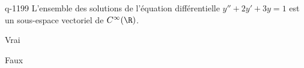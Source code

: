 \begin{truefalse}{q-1199}
L'ensemble des solutions de l'équation différentielle $y'' + 2y' + 3y = 1$ est un sous-espace vectoriel de $C^\infty(\R)$.
\item Vrai
\item* Faux
\end{truefalse}

